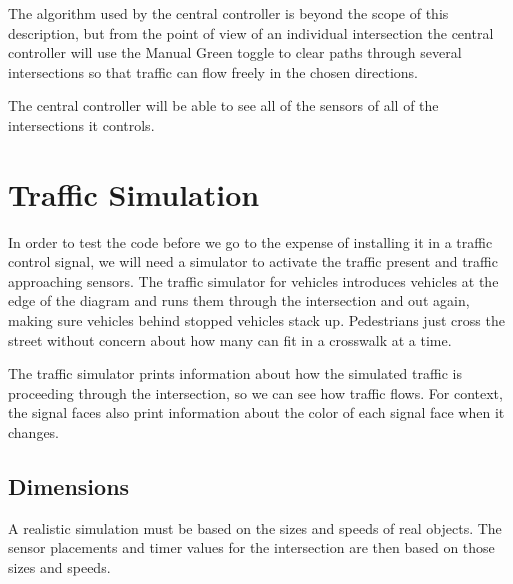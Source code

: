 \documentclass[letterpaper,twoside]{article}
\begin{document}
The algorithm used by the central controller is beyond the scope of this
description, but from the point of view of an individual intersection
the central controller will use the Manual Green toggle to clear paths
through several intersections so that traffic can flow freely in the
chosen directions.

The central controller will be able to see all of the sensors of all
of the intersections it controls.

\section{Traffic Simulation}

In order to test the code before we go to the expense of installing
it in a traffic control signal, we will need a simulator to activate the
traffic present and traffic approaching sensors.  The traffic simulator
for vehicles introduces vehicles at the edge of the diagram and
runs them through the intersection and out again, making sure vehicles
behind stopped vehicles stack up.  Pedestrians just cross the street
without concern about how many can fit in a crosswalk at a time.

The traffic simulator prints information about how the simulated
traffic is proceeding through the intersection, so we can see how
traffic flows.  For context, the signal faces also print information
about the color of each signal face when it changes.

\subsection{Dimensions}

A realistic simulation must be based on the sizes and speeds of real objects.
The sensor placements and timer values for the intersection are then
based on those sizes and speeds.
\end{document}
